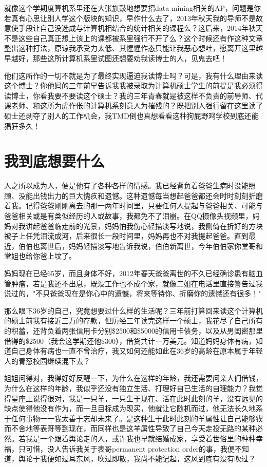 \documentclass[12pt]{book}
\begin{document}
就像这个学期度算机系里还在大张旗鼓地想要招data mining相关的AP，问题是你若真有心思让别人学这个版块的知识，早作什么去了，2013年秋天我的导师不是故意使手段让自己没选成与计算机相结合的统计相关的课程么？这后来，2014年秋天不是这些自己真正想上该上的课都被系里强行不开了么？这个时候还有作这种文章整出这种打法，原谅我承受力太低、其惺惺作态只能让我恶心想吐，愿离开这里越早越好，那些这所计算机系里试图还想要劝我读博士的人，见鬼去吧！

他们这所作的一切不就是为了最终实现逼迫我读博士吗？可是，我有什么理由来读这个博士？你他妈的三年前早告诉我我被录取为计算机硕士学生的前提是我必须得读博士，你看我要不要读这个硕士？我的三年青春就是被这样不负责的前导师、代课老师、和这所为虎作伥的计算机系刻意人为摧残的？既把别人强行留在这里读了硕士还剥夺了别人的工作机会，我TMD倒也真想看看这种狗屁野鸡学校到底还能猖狂多久！
\chapter{我到底想要什么}
\label{sec-45}
人之所以成为人，便是他有了各种各样的情感。我已经背负着爸爸生病时没能照顾、没能出钱出力的巨大愧疚和遗憾。这种遗憾每当想起爸爸都还会时时刻刻折磨着我。记得爸爸刚刚离去的那一两年时间里，只要任何人提起与爸爸相关、可能与爸爸相关或是有类似经历的人或故事，我都免不了泪崩。在QQ摄像头视频里，妈妈对我讲起爸爸临走前的光景，妈妈怕我伤心轻描淡写地说，我侧倚在折好的方块被子上任凭泪流成河，后来很长一段时间里，妈妈再也不对我提起爸爸。直到最近，伯伯也离世后，妈妈轻描淡写地告诉我说，伯伯新离世，今年伯伯家你堂哥和堂姐也给你爸上坟了。

妈妈现在已经65岁，而且身体不好，2012年春天爸爸离世的不久已经确诊患有脑血管肿瘤，若是我还不出息，既没工作也不成个家，就像二姐在电话里直接警告过我说过的，"不只爸爸现在是你心中的遗憾，将来等待你、折磨你的遗憾还有很多！"

那么眼下36岁的自己，究竟想要过什么样的生活呢？三年前打算回来读这个计算机的硕士前我有接近三万的存款，但历经三年读完这样一个硕士，我花尽了自己所有的积蓄，还背负着两张信用卡分别\$2500和\$5000的信用卡债务，以及从男闺密那里借得的\$2500（我会这学期还他\$300），借贷共计一万美元。知道妈妈身体有病，知道自己身体有病也一直不曾治疗，我又如何还能如此在36岁的高龄在原本属于年轻人的青葱校园继续混下去？

姐姐问得对，我得好好反醒一下，为什么在这样的年龄，我还需要问亲人们借钱，为什么在这样的年龄，我似乎还没有独立生活、打理好自已生活的自理能力？我觉得星座上说得很对，我是一只羊，一只生于现在、活在此时此刻的羊，没有远见的缺点使得他没有作为，而一旦目标成为现买，他就让它随机而过，他无法长久地系于任何事物一一我太善于忘却未来了。是这种生于此时此刻的羊属性让自己能够锲而不舍地等表哥等到现在，而同样也是这羊属性导致了自己今天走投无路的某种必然。若我是一个跟着舆论走的人，或许我也早就结婚成家，享受着世俗里的种种幸福，只可惜，没人告诉我关于表哥permanent protection order的事，我便不知道，舆论于我便如过耳东风，吹过即散，我尚不能记起，这风到底有没有吹过？
\end{document}
